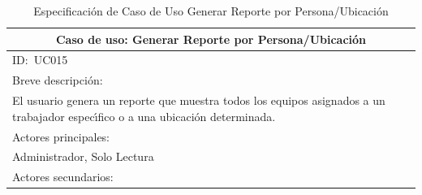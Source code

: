 \documentclass[stu, 12pt, letterpaper, donotrepeattitle, floatsintext, natbib]{apa7}
\begin{document}
\begin{longtable}{@{} p{16.5cm} @{}}
    \caption{Especificaci\'on de Caso de Uso Generar Reporte por Persona/Ubicaci\'on}\label{tab:UC015}                                                                                                                                                                           \\ \toprule
    \multicolumn{1}{c}{Caso de uso: Generar Reporte por Persona/Ubicaci\'on}                                                                                                                                                                                                     \\ \midrule
    ID:~UC015                                                                                                                                                                                                                                                                    \\ \midrule
    Breve descripci\'on:                                                                                                                                                                                                                                                         \\
    El usuario genera un reporte que muestra todos los equipos asignados a un trabajador espec\'{\i}fico o a una ubicaci\'on determinada.                                                                                                                                        \\ \midrule
    Actores principales:                                                                                                                                                                                                                                                         \\
    Administrador, Solo Lectura                                                                                                                                                                                                                                                  \\ \midrule
    Actores secundarios:                                                                                                                                                                                                                                                         \\

\end{longtable}
\end{document}
